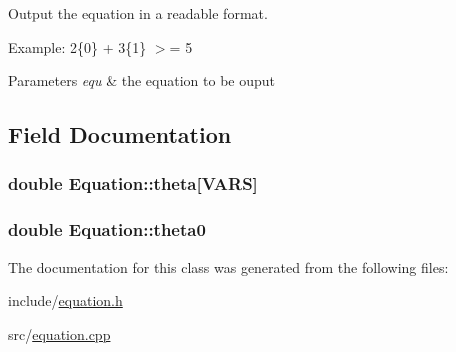 Output the equation in a readable format. 

Example\+: 2\{0\} + 3\{1\} $>$= 5


\begin{DoxyParams}{Parameters}
{\em equ} & the equation to be ouput \\
\hline
\end{DoxyParams}


\subsection{Field Documentation}
\subsubsection[{theta}]{\setlength{\rightskip}{0pt plus 5cm}double Equation\+::theta\mbox{[}{\bf V\+A\+RS}\mbox{]}}\hypertarget{classEquation_af346bba0364be7c84ebc969061d0315f}{}\label{classEquation_af346bba0364be7c84ebc969061d0315f}
\subsubsection[{theta0}]{\setlength{\rightskip}{0pt plus 5cm}double Equation\+::theta0}\hypertarget{classEquation_aa3da62783d229956703741c758b6fd69}{}\label{classEquation_aa3da62783d229956703741c758b6fd69}


The documentation for this class was generated from the following files\+:\begin{DoxyCompactItemize}
\item 
include/\hyperlink{equation_8h}{equation.\+h}\item 
src/\hyperlink{equation_8cpp}{equation.\+cpp}\end{DoxyCompactItemize}
